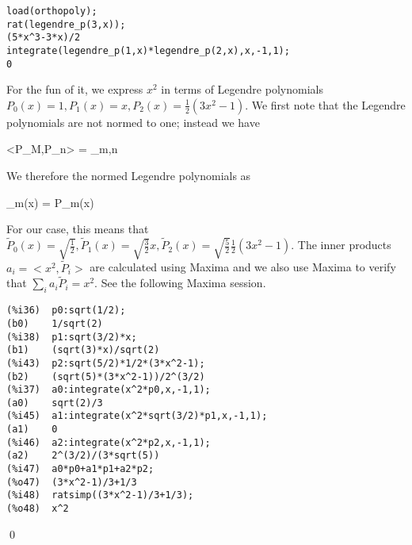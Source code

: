 \begin{verbatim}
load(orthopoly);
rat(legendre_p(3,x));
(5*x^3-3*x)/2
integrate(legendre_p(1,x)*legendre_p(2,x),x,-1,1);
0
\end{verbatim}

For the fun of it, we express $x^2$ in terms of Legendre polynomials $P_0(x) = 1, P_1(x) = x, P_2(x) = \frac{1}{2}(3x^2-1)$. We first note that the Legendre polynomials are not normed to one; instead we have

\bee
<P_M,P_n> =  \delta_{m,n}
\eee

We therefore the normed Legendre polynomials as

\bee
{}_m(x) =  P_m(x)
\eee

For our case, this means that $\tilde{P}_0(x) = \sqrt{\frac{1}{2}}, \tilde{P}_1(x) = \sqrt{\frac{3}{2}}x, \tilde{P}_2(x) = \sqrt{\frac{5}{2}}\frac{1}{2}(3x^2-1)$. The inner products $a_i = <x^2, \tilde{P}_i>$ are calculated using Maxima and we also use Maxima to verify that $\sum_i a_i \tilde{P}_i = x^2$. See the following Maxima session.

\begin{verbatim}
(%i36)	p0:sqrt(1/2);
(b0)	1/sqrt(2)
(%i38)	p1:sqrt(3/2)*x;
(b1)	(sqrt(3)*x)/sqrt(2)
(%i43)	p2:sqrt(5/2)*1/2*(3*x^2-1);
(b2)	(sqrt(5)*(3*x^2-1))/2^(3/2)
(%i37)	a0:integrate(x^2*p0,x,-1,1);
(a0)	sqrt(2)/3
(%i45)	a1:integrate(x^2*sqrt(3/2)*p1,x,-1,1);
(a1)	0
(%i46)	a2:integrate(x^2*p2,x,-1,1);
(a2)	2^(3/2)/(3*sqrt(5))
(%i47)	a0*p0+a1*p1+a2*p2;
(%o47)	(3*x^2-1)/3+1/3
(%i48)	ratsimp((3*x^2-1)/3+1/3);
(%o48)	x^2
\end{verbatim}

\qed

